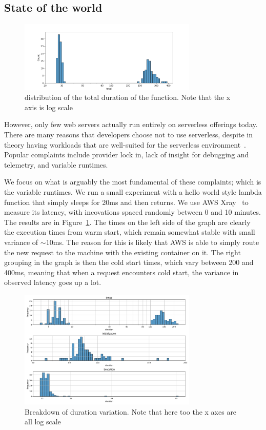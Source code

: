 \subsection{State of the world}


\begin{figure}[t!]
    \centering
      \includegraphics[width=8.5cm]{img/lambda_total_durations.png}
      \caption{ distribution of the total duration of the function. Note that the x axis is log scale }
    \label{fig:lambda-total-durations}
\end{figure}

However, only few web servers actually run entirely on serverless offerings
today. There are many reasons that developers choose not to use serverless,
despite in theory having workloads that are well-suited for the serverless
environment~\cite{not-lambda-blog,reddit-serverless2}. Popular complaints
include provider lock in, lack of insight for debugging and telemetry, and
variable runtimes.


We focus on what is arguably the most fundamental of these complaints; which is
the variable runtimes. We run a small experiment with a hello world style lambda
function that simply sleeps for 20ms and then returns. We use AWS
Xray~\cite{aws-xray} to measure its latency, with incovations spaced randomly
between 0 and 10 minutes. The results are in
Figure~\ref{fig:lambda-total-durations}. The times on the left side of the graph
are clearly the execution times from warm start, which remain somewhat stable
with small variance of $\sim$10ms. The reason for this is likely that AWS is
able to simply route the new request to the machine with the existing container
on it. The right grouping in the graph is then the cold start times, which vary
between 200 and 400ms, meaning that when a request encounters cold start, the
variance in observed latency goes up a lot. 

\begin{figure}[t!]
  \centering
    \includegraphics[width=8.5cm]{img/lambda_duration_breakdown.png}
    \caption{ Breakdown of duration variation. Note that here too the x axes are all log scale }
  \label{fig:lambda-durations-breakdown}
\end{figure}

